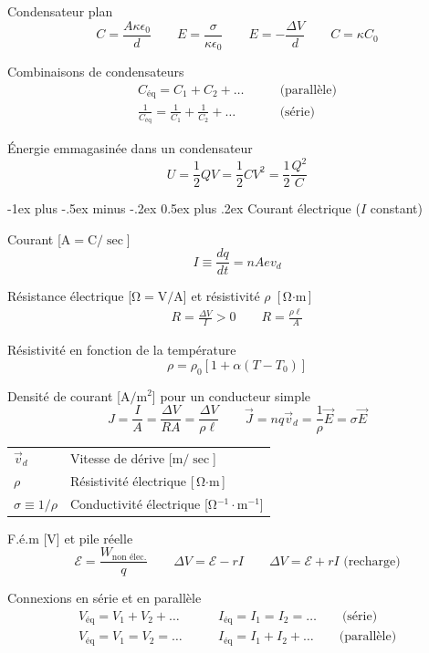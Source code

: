 \documentclass[10pt,landscape]{article}
\makeatletter
\renewcommand{\section}{\@startsection{section}{1}{0mm}%
                                {-1ex plus -.5ex minus -.2ex}%
                                {0.5ex plus .2ex}%
                                {\normalfont\large\bfseries}}
\newcommand{\halfline}{\vspace{0.5em}}
\newcommand{\tableindent}{\hspace{1.5em}}
\newcommand{\emf}{\ensuremath{\mathcal{E}}}
\makeatother
\begin{document}
\begin{multicols}{3}
Condensateur plan \[ C = \frac{A\kappa\epsilon_0}{d} 
\qquad 
E = \frac{\sigma}{\kappa\epsilon_0}
\qquad
E =  -\frac{\Delta V}{d} 
\qquad
C = \kappa C_0 \]

Combinaisons de condensateurs \begin{align*}
C_\text{éq} = C_1 + C_2 + \dots  \qquad &\text{(parallèle)} \\
\frac{1}{C_\text{éq}} = \frac{1}{C_1} + \frac{1}{C_2} + \dots \qquad &\text{(série)}
\end{align*}


Énergie emmagasinée dans un condensateur
\[ U = \frac{1}{2} QV = \frac{1}{2} CV^2 = \frac{1}{2}\frac{Q^2}{C} \]


\hrulefill

\section{Courant électrique ($I$ constant)}

Courant [$\si{\ampere} = \si{\coulomb}/\si{\sec}$]
\[ I \equiv \frac{dq}{dt} = n A e v_d \]

Résistance électrique [$\si{\ohm} = \si{\volt/\ampere}$] et résistivité $\rho$ [$\si{\ohm\cdot\meter}$]
\begin{gather*}
R = \frac{\Delta V}{I}  > 0   \qquad 
R = \frac{\rho \ell}{A}
\end{gather*}

Résistivité en fonction de la température
\[ \rho = \rho_0[1 + \alpha(T-T_0)] \]

Densité de courant [$\si{\ampere/\meter^2}$] pour un conducteur simple
\[ J = \frac{I}{A} = \frac{\Delta V}{RA} =  \frac{\Delta V}{\rho \ell} 
\qquad \vec{J} = n q \vec{v}_d  = \frac{1}{\rho}\vec{E} = \sigma \vec{E} \]

\begin{tabular}{@{\tableindent}ll@{}}
	$\vec{v}_d$ & Vitesse de dérive [$\si{\metre/\sec}$] \\
	$\rho$ & Résistivité électrique  [$\si{\ohm\cdot\meter}$] \\
	$\sigma \equiv 1/\rho$ & Conductivité électrique [$\si{\ohm^{-1}\cdot\meter^{-1}}$] \\
\end{tabular}
\halfline

F.é.m [\si{\volt}] et pile réelle
\[ \emf = \frac{W_\text{non élec.}}{q} \qquad
\Delta V = \emf - rI 
\qquad \Delta V = \emf + rI \text{ (recharge)}\]

Connexions en série et en parallèle
\begin{align*}
	V_\text{éq} = V_1 + V_2 + \dots  & \qquad
		I_\text{éq} = I_1 = I_2 = \dots   \qquad
		\text{(série)} \\
	V_\text{éq} = V_1 = V_2 = \dots  & \qquad
		I_\text{éq} = I_1 + I_2 + \dots   \qquad
		\text{(parallèle)}
\end{align*}


\end{multicols}
\end{document}
